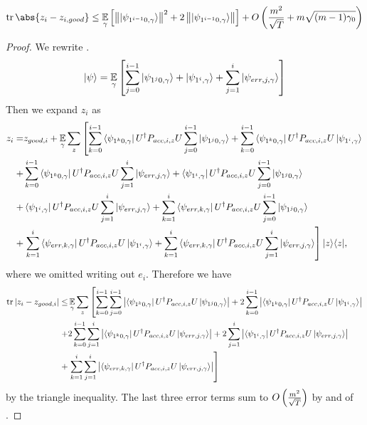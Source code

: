 \begin{lemma}
	\label{thm:zi-zgoodi}
	$$\tr\abs{z_i-z_{i, good}}\leq\E_\gamma\L[\norm{\ket{\psi_{1^{i-1}0,\gamma}}}^2+ 2\norm{\ket{\psi_{1^{i-1}0,\gamma}}}\R]+O\L(\frac{m^2}{\sqrt T}+m\sqrt{(m-1)\gamma_0}\R)$$
\end{lemma}
\begin{proof}
	We rewrite .
	$$\ket{\psi}=\operatorname*{\mathbb{E}}_{\gamma}\left[
		\sum_{j=0}^{i-1} \ket{\psi_{1^j0,\gamma}} +\ket{\psi_{1^i,\gamma}} +\sum_{j=1}^{i}\ket{\psi_{err,j,\gamma}}
	\right]$$
	Then we expand $z_i$ as
	\begin{align}
		z_i=& z_{good,i}+ \operatorname*{\mathbb{E}}_\gamma \sum_z \left[\sum_{k=0}^{i-1} \bra{\psi_{1^k0,\gamma}}U^\dag  P_{acc,i,z}U   \sum_{j=0}^{i-1} \ket{\psi_{1^j0,\gamma}}+
		\sum_{k=0}^{i-1} \bra{\psi_{1^k0,\gamma}}U^\dag  P_{acc,i,z}U \ket{\psi_{1^i,\gamma}}  \right. \nonumber \\
		+&  \sum_{k=0}^{i-1} \bra{\psi_{1^k0,\gamma}}U^\dag  P_{acc,i,z}U\sum_{j=1}^{i}\ket{\psi_{err,j,\gamma}}
		+\bra{\psi_{1^i,\gamma}} U^\dag  P_{acc,i,z}U \sum_{j=0}^{i-1} \ket{\psi_{1^j0,\gamma}}
		\nonumber \\
		+&  \bra{\psi_{1^i,\gamma}} U^\dag  P_{acc,i,z}U \sum_{j=1}^{i}\ket{\psi_{err,j,\gamma}}
		+\sum_{k=1}^{i}\bra{\psi_{err,k,\gamma}} U^\dag  P_{acc,i,z}U  \sum_{j=0}^{i-1} \ket{\psi_{1^j0,\gamma}}
		\nonumber \\
		+&\left.   \sum_{k=1}^{i}\bra{\psi_{err,k,\gamma}} U^\dag  P_{acc,i,z}U \ket{\psi_{1^i,\gamma}} +\sum_{k=1}^{i}\bra{\psi_{err,k,\gamma}} U^\dag  P_{acc,i,z}U \sum_{j=1}^{i}\ket{\psi_{err,j,\gamma}} \right] |z\rangle\langle z| , \nonumber     
	\end{align}
	where we omitted writing out $e_i$.
	Therefore we have
	\begin{align*}
		\tr|z_i-z_{good,i}|\leq& \E_\gamma \sum_z \L[ \sum_{k=0}^{i-1} \sum_{j=0}^{i-1} \L| \bra{\psi_{1^k0,\gamma}}U^\dag  P_{acc,i,z}U \ket{\psi_{1^j0,\gamma}} \R|+
		2 \sum_{k=0}^{i-1} \L|\bra{\psi_{1^k0,\gamma}}U^\dag  P_{acc,i,z}U \ket{\psi_{1^i,\gamma}} \R|  \R. \\
		+& 2 \sum_{k=0}^{i-1}\sum_{j=1}^{i}\L| \bra{\psi_{1^k0,\gamma}}U^\dag  P_{acc,i,z}U\ket{\psi_{err,j,\gamma}}\R|    
		+2 \sum_{j=1}^{i}\L|\bra{\psi_{1^i,\gamma}} U^\dag  P_{acc,i,z}U \ket{\psi_{err,j,\gamma}}\R| \\
		+&\L. \sum_{k=1}^{i}\sum_{j=1}^{i}\L| \bra{\psi_{err,k,\gamma}} U^\dag  P_{acc,i,z}U \ket{\psi_{err,j,\gamma}}\R| \R] \\ %
	\end{align*}
	by the triangle inequality.
	The last three error terms sum to $O\left(\frac{m^2}{\sqrt{T}}\right)$ by  and  of .


\end{proof}
